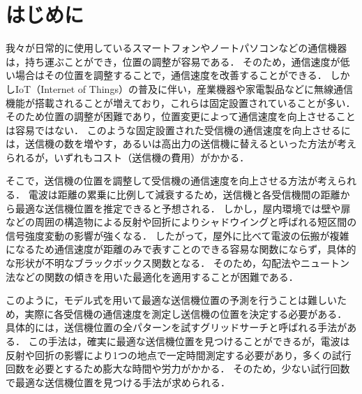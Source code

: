 \documentclass[twocolumn]{ltjarticle}
\begin{document}



\section{はじめに}
我々が日常的に使用しているスマートフォンやノートパソコンなどの通信機器は，持ち運ぶことができ，位置の調整が容易である．
そのため，通信速度が低い場合はその位置を調整することで，通信速度を改善することができる．
しかしIoT（Internet of Things）の普及に伴い，産業機器や家電製品などに無線通信機能が搭載されることが増えており，これらは固定設置されていることが多い\cite{soumu}．
そのため位置の調整が困難であり，位置変更によって通信速度を向上させることは容易ではない．
このような固定設置された受信機の通信速度を向上させるには，送信機の数を増やす，あるいは高出力の送信機に替えるといった方法が考えられるが，いずれもコスト（送信機の費用）がかかる．

そこで，送信機の位置を調整して受信機の通信速度を向上させる方法が考えられる．
電波は距離の累乗に比例して減衰するため，送信機と各受信機間の距離から最適な送信機位置を推定できると予想される．
しかし，屋内環境では壁や扉などの周囲の構造物による反射や回折によりシャドウイングと呼ばれる短区間の信号強度変動の影響が強くなる．
したがって，屋外に比べて電波の伝搬が複雑になるため通信速度が距離のみで表すことのできる容易な関数にならず，具体的な形状が不明なブラックボックス関数となる．
そのため，勾配法やニュートン法などの関数の傾きを用いた最適化を適用することが困難である．

このように，モデル式を用いて最適な送信機位置の予測を行うことは難しいため，実際に各受信機の通信速度を測定し送信機の位置を決定する必要がある．
具体的には，送信機位置の全パターンを試すグリッドサーチと呼ばれる手法がある．
この手法は，確実に最適な送信機位置を見つけることができるが，電波は反射や回折の影響により1つの地点で一定時間測定する必要があり，多くの試行回数を必要とするため膨大な時間や労力がかかる．
そのため，少ない試行回数で最適な送信機位置を見つける手法が求められる．
\end{document}
